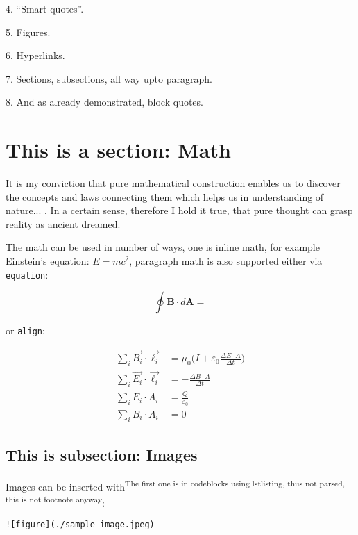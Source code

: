 \documentclass[12pt, UTF8]{article}
\begin{document}
	4. ``Smart quotes''.
	
	5. Figures.
	
	6. Hyperlinks.
	
	7. Sections, subsections, all way upto paragraph.
	
	8. And as already demonstrated, block quotes.
	
	\newpage
	
	\section{This is a section: Math}
	
	\begin{displayquote}
		It is my conviction that pure mathematical construction enables us to discover
		the concepts and laws connecting them which helps us in understanding of nature... .
		In a certain sense, therefore I hold it true, that pure thought
		can grasp reality as ancient dreamed.
	\end{displayquote}
	
	The math can be used in number of ways, one is inline math, for example Einstein's equation: $E = mc^2$, paragraph math is also supported either via \texttt{equation}:
	
	\begin{equation}
		\oint \boldsymbol{B} \cdot d \boldsymbol{A} = 
	\end{equation}
	
	or \texttt{align}:
	
	\begin{align}
		\sum_{i} \vec{B_{i}} \cdot \vec{\ell_{i}} &= \mu_{0} \bigg(I + \varepsilon_{0} \frac{\Delta E \cdot A}{\Delta t} \bigg)\\
		\sum_{i} \vec{E_{i}} \cdot \vec{\ell_{i}} &= - \frac{\Delta B \cdot A}{\Delta t}\\
		\sum_{i} E_{i} \cdot A_{i} &= \frac{Q}{\varepsilon_{0}}\\
		\sum_{i} B_{i} \cdot A_{i} &= 0
	\end{align}
	
	\subsection{This is subsection: Images}
	
	Images can be inserted with\textsuperscript{The first one is in codeblocks using lstlisting, thus not parsed, this is not footnote anyway}:
	
\begin{lstlisting}
![figure](./sample_image.jpeg)
\end{lstlisting}
	
\end{document}
